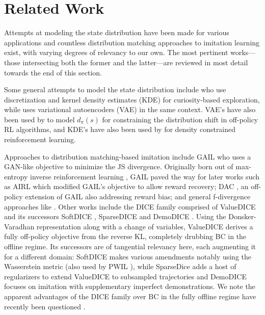 \section{Related Work} 


Attempts at modeling the state distribution have been made for various applications and countless distribution matching approaches to imitation learning exist, with varying degrees of relevancy to our own. The most pertinent works—those intersecting both the former and the latter—are reviewed in most detail towards the end of this section.


Some general attempts to model the state distribution include \cite{hazan2019provably} who use discretization and kernel density estimates (KDE) for curiosity-based exploration, while \cite{lee2019efficient} uses variational autoencoders (VAE) in the same context. VAE's have also been used by \cite{islam2019off} to model $d_\pi(s)$ for constraining the distribution shift in off-policy RL algorithms, and KDE's have also been used by \cite{qin2021density} for density constrained reinforcement learning.

Approaches to distribution matching-based imitation include GAIL \cite{ho2016generative} who uses a GAN-like \cite{goodfellow2014generative} objective to minimize the JS divergence. Originally born out of max-entropy inverse reinforcement learning \cite{ziebart2008maximum}, GAIL paved the way for later works such as AIRL \cite{fu2017learning} which modified GAIL's objective to allow reward recovery; DAC \cite{kostrikov2018discriminator}, an off-policy extension of GAIL also addressing reward bias; and general f-divergence approaches like \cite{ke2020imitation, ghasemipour2020divergence}. Other works include the DICE \cite{nachum2019dualdice} family comprised of ValueDICE \cite{kostrikov2019imitation} and its successors SoftDICE \cite{sun2021softdice}, SparseDICE \cite{camacho2021sparsedice} and DemoDICE \cite{kim2021demodice}. Using the Donsker-Varadhan representation along with a change of variables, ValueDICE derives a fully off-policy objective from the reverse KL, completely drubbing BC in the offline regime. Its successors are of tangential relevancy here, each augmenting it for a different domain: SoftDICE makes various amendments notably using the Wasserstein metric (also used by PWIL \cite{dadashi2020primal}), while SparseDice adds a host of regularizers to extend ValueDICE to subsampled trajectories and DemoDICE focuses on imitation with supplementary imperfect demonstrations. We note the apparent advantages of the DICE family over BC in the fully offline regime have recently been questioned \cite{li2022rethinking}.


